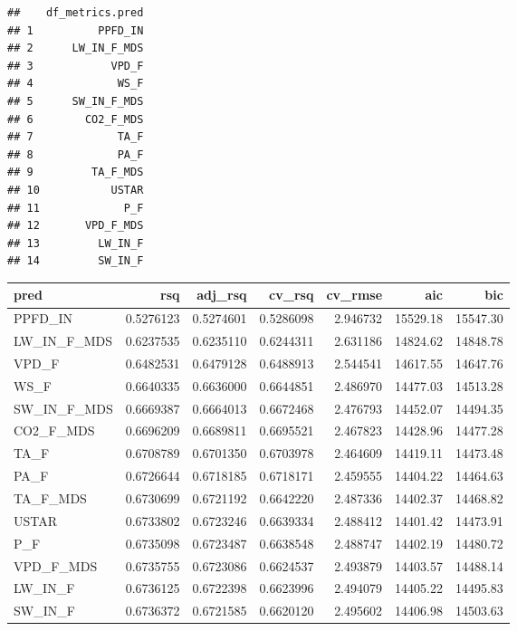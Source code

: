 \documentclass[
]{book}
\newenvironment{Shaded}{\begin{snugshade}}{\end{snugshade}}
\newcommand{\KeywordTok}[1]{\textcolor[rgb]{0.13,0.29,0.53}{\textbf{#1}}}
\newcommand{\NormalTok}[1]{#1}
\newcommand{\OperatorTok}[1]{\textcolor[rgb]{0.81,0.36,0.00}{\textbf{#1}}}
\newcommand{\StringTok}[1]{\textcolor[rgb]{0.31,0.60,0.02}{#1}}
\begin{document}
\begin{verbatim}
##    df_metrics.pred
## 1          PPFD_IN
## 2      LW_IN_F_MDS
## 3            VPD_F
## 4             WS_F
## 5      SW_IN_F_MDS
## 6        CO2_F_MDS
## 7             TA_F
## 8             PA_F
## 9         TA_F_MDS
## 10           USTAR
## 11             P_F
## 12       VPD_F_MDS
## 13         LW_IN_F
## 14         SW_IN_F
\end{verbatim}

\begin{Shaded}
\end{Shaded}

\begin{tabular}{l|r|r|r|r|r|r}
\hline
pred & rsq & adj\_rsq & cv\_rsq & cv\_rmse & aic & bic\\
\hline
PPFD\_IN & 0.5276123 & 0.5274601 & 0.5286098 & 2.946732 & 15529.18 & 15547.30\\
\hline
LW\_IN\_F\_MDS & 0.6237535 & 0.6235110 & 0.6244311 & 2.631186 & 14824.62 & 14848.78\\
\hline
VPD\_F & 0.6482531 & 0.6479128 & 0.6488913 & 2.544541 & 14617.55 & 14647.76\\
\hline
WS\_F & 0.6640335 & 0.6636000 & 0.6644851 & 2.486970 & 14477.03 & 14513.28\\
\hline
SW\_IN\_F\_MDS & 0.6669387 & 0.6664013 & 0.6672468 & 2.476793 & 14452.07 & 14494.35\\
\hline
CO2\_F\_MDS & 0.6696209 & 0.6689811 & 0.6695521 & 2.467823 & 14428.96 & 14477.28\\
\hline
TA\_F & 0.6708789 & 0.6701350 & 0.6703978 & 2.464609 & 14419.11 & 14473.48\\
\hline
PA\_F & 0.6726644 & 0.6718185 & 0.6718171 & 2.459555 & 14404.22 & 14464.63\\
\hline
TA\_F\_MDS & 0.6730699 & 0.6721192 & 0.6642220 & 2.487336 & 14402.37 & 14468.82\\
\hline
USTAR & 0.6733802 & 0.6723246 & 0.6639334 & 2.488412 & 14401.42 & 14473.91\\
\hline
P\_F & 0.6735098 & 0.6723487 & 0.6638548 & 2.488747 & 14402.19 & 14480.72\\
\hline
VPD\_F\_MDS & 0.6735755 & 0.6723086 & 0.6624537 & 2.493879 & 14403.57 & 14488.14\\
\hline
LW\_IN\_F & 0.6736125 & 0.6722398 & 0.6623996 & 2.494079 & 14405.22 & 14495.83\\
\hline
SW\_IN\_F & 0.6736372 & 0.6721585 & 0.6620120 & 2.495602 & 14406.98 & 14503.63\\
\hline
\end{tabular}
\end{document}
